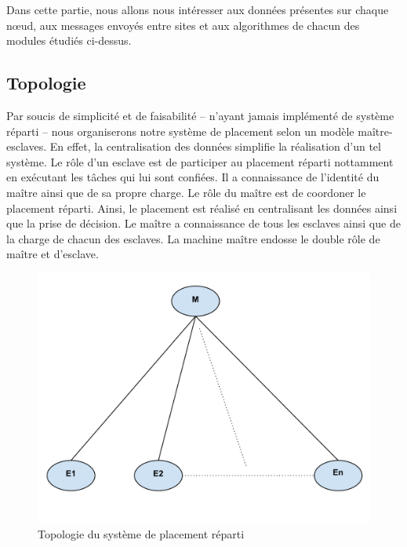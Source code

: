   Dans cette partie, nous allons nous intéresser aux données présentes
  sur chaque n\oe{}ud, aux messages envoyés entre sites et aux
  algorithmes de chacun des modules étudiés ci-dessus.

  \subsection{Topologie}

    Par soucis de simplicité et de faisabilité -- n'ayant jamais
    implémenté de système réparti -- nous organiserons notre système
    de placement selon un modèle maître-esclaves. En effet, la
    centralisation des données simplifie la réalisation d'un tel
    système. Le rôle d'un esclave est de participer au placement
    réparti nottamment en exécutant les tâches qui lui sont
    confiées. Il a connaissance de l'identité du maître ainsi que de
    sa propre charge. Le rôle du maître est de coordoner le placement
    réparti. Ainsi, le placement est réalisé en centralisant les
    données ainsi que la prise de décision. Le maître a connaissance
    de tous les esclaves ainsi que de la charge de chacun des
    esclaves. La machine maître endosse le double rôle de maître
    et d'esclave.
        
    \begin{figure}[h!]
      \centering
      \includegraphics[scale=0.45]{img/topologie.pdf}
      \caption{Topologie du système de placement réparti}
    \end{figure}
      

